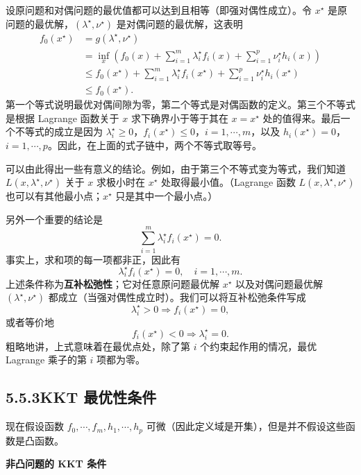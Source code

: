 \documentclass[UTF8,12pt,a4paper,fontset=fandol]{ctexart}
\begin{document}
设原问题和对偶问题的最优值都可以达到且相等（即强对偶性成立）。令 $x^\star$ 是原问题的最优解，$(\lambda^\star,\nu^\star)$ 是对偶问题的最优解，这表明
\[
\begin{aligned}
f_0(x^\star)
&=g(\lambda^\star,\nu^\star)\\
&=\inf_x\left(f_0(x)+\sum_{i=1}^m\lambda_i^\star f_i(x)+\sum_{i=1}^p\nu_i^\star h_i(x)\right)\\
&\leq f_0(x^\star)+\sum_{i=1}^m\lambda_i^\star f_i(x^\star)+\sum_{i=1}^p\nu_i^\star h_i(x^\star)\\
&\leq f_0(x^\star).
\end{aligned}
\]
第一个等式说明最优对偶间隙为零，第二个等式是对偶函数的定义。第三个不等式是根据 Lagrange 函数关于 $x$ 求下确界小于等于其在 $x=x^\star$ 处的值得来。最后一个不等式的成立是因为 $\lambda_i^\star\geq 0$，$f_i(x^\star)\leq 0$，$i=1,\cdots,m$，以及 $h_i(x^\star)=0$，$i=1,\cdots,p$。因此，在上面的式子链中，两个不等式取等号。

可以由此得出一些有意义的结论。例如，由于第三个不等式变为等式，我们知道 $L(x,\lambda^\star,\nu^\star)$ 关于 $x$ 求极小时在 $x^\star$ 处取得最小值。（Lagrange 函数 $L(x,\lambda^\star,\nu^\star)$ 也可以有其他最小点；$x^\star$ 只是其中一个最小点。）

另外一个重要的结论是
\[
\sum_{i=1}^m\lambda_i^\star f_i(x^\star)=0.
\]
事实上，求和项的每一项都非正，因此有
\begin{equation}
\lambda_i^\star f_i(x^\star)=0,\quad i=1,\cdots,m.
\tag{5.48}
\end{equation}
上述条件称为\textbf{互补松弛性}；它对任意原问题最优解 $x^\star$ 以及对偶问题最优解 $(\lambda^\star,\nu^\star)$ 都成立（当强对偶性成立时）。我们可以将互补松弛条件写成
\[
\lambda_i^\star>0\Longrightarrow f_i(x^\star)=0,
\]
或者等价地
\[
f_i(x^\star)<0\Longrightarrow \lambda_i^\star=0.
\]
粗略地讲，上式意味着在最优点处，除了第 $i$ 个约束起作用的情况，最优 Lagrange 乘子的第 $i$ 项都为零。

\subsection*{5.5.3\quad KKT 最优性条件}

现在假设函数 $f_0,\cdots,f_m,h_1,\cdots,h_p$ 可微（因此定义域是开集），但是并不假设这些函数是凸函数。

\noindent\textbf{非凸问题的 KKT 条件}
\end{document}
